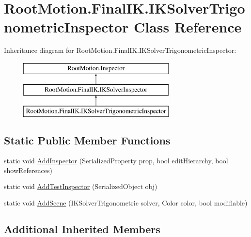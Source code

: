 \hypertarget{class_root_motion_1_1_final_i_k_1_1_i_k_solver_trigonometric_inspector}{}\section{Root\+Motion.\+Final\+I\+K.\+I\+K\+Solver\+Trigonometric\+Inspector Class Reference}
\label{class_root_motion_1_1_final_i_k_1_1_i_k_solver_trigonometric_inspector}
Inheritance diagram for Root\+Motion.\+Final\+I\+K.\+I\+K\+Solver\+Trigonometric\+Inspector\+:\begin{figure}[H]
\begin{center}
\leavevmode
\includegraphics[height=3.000000cm]{class_root_motion_1_1_final_i_k_1_1_i_k_solver_trigonometric_inspector}
\end{center}
\end{figure}
\subsection*{Static Public Member Functions}
\begin{DoxyCompactItemize}
\item 
static void \mbox{\hyperlink{class_root_motion_1_1_final_i_k_1_1_i_k_solver_trigonometric_inspector_a9610535f0a1420e28f61642c5839bbf1}{Add\+Inspector}} (Serialized\+Property prop, bool edit\+Hierarchy, bool show\+References)
\item 
static void \mbox{\hyperlink{class_root_motion_1_1_final_i_k_1_1_i_k_solver_trigonometric_inspector_ac081997c71d7498497cf6280060a7450}{Add\+Test\+Inspector}} (Serialized\+Object obj)
\item 
static void \mbox{\hyperlink{class_root_motion_1_1_final_i_k_1_1_i_k_solver_trigonometric_inspector_aaec6e72bb1a82258c60dd7d9587fca5d}{Add\+Scene}} (I\+K\+Solver\+Trigonometric solver, Color color, bool modifiable)
\end{DoxyCompactItemize}
\subsection*{Additional Inherited Members}


